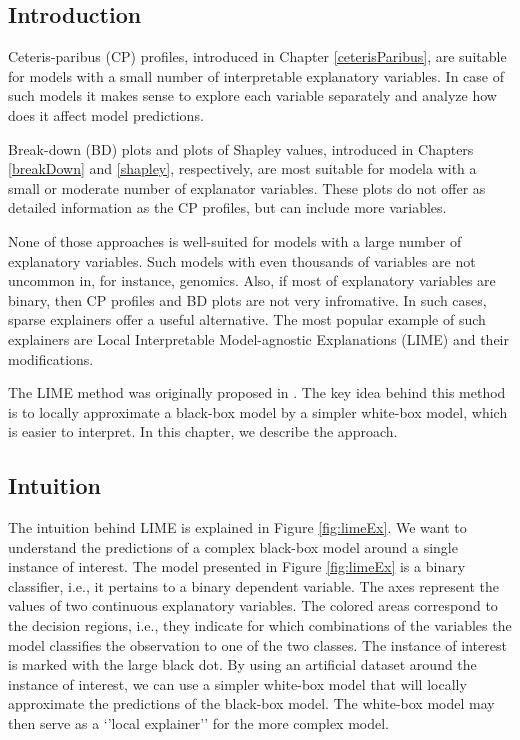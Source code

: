 \documentclass[12pt,]{krantz}
\begin{document}
\hypertarget{LIMEIntroduction}{%
\subsection{Introduction}\label{LIMEIntroduction}}

Ceteris-paribus (CP) profiles, introduced in Chapter \ref{ceterisParibus}, are suitable for models with a small number of interpretable explanatory variables. In case of such models it makes sense to explore each variable separately and analyze how does it affect model predictions.

Break-down (BD) plots and plots of Shapley values, introduced in Chapters \ref{breakDown} and \ref{shapley}, respectively, are most suitable for modela with a small or moderate number of explanator variables. These plots do not offer as detailed information as the CP profiles, but can include more variables.

None of those approaches is well-suited for models with a large number of explanatory variables. Such models with even thousands of variables are not uncommon in, for instance, genomics. Also, if most of explanatory variables are binary, then CP profiles and BD plots are not very infromative. In such cases, sparse explainers offer a useful alternative. The most popular example of such explainers are Local Interpretable Model-agnostic Explanations (LIME) and their modifications.

The LIME method was originally proposed in \citep{lime}. The key idea behind this method is to locally approximate a black-box model by a simpler white-box model, which is easier to interpret. In this chapter, we describe the approach.

\hypertarget{LIMEIntuition}{%
\subsection{Intuition}\label{LIMEIntuition}}

The intuition behind LIME is explained in Figure \ref{fig:limeEx}. We want to understand the predictions of a complex black-box model around a single instance of interest. The model presented in Figure \ref{fig:limeEx} is a binary classifier, i.e., it pertains to a binary dependent variable. The axes represent the values of two continuous explanatory variables. The colored areas correspond to the decision regions, i.e., they indicate for which combinations of the variables the model classifies the observation to one of the two classes. The instance of interest is marked with the large black dot. By using an artificial dataset around the instance of interest, we can use a simpler white-box model that will locally approximate the predictions of the black-box model. The white-box model may then serve as a `'local explainer'' for the more complex model.
\end{document}
